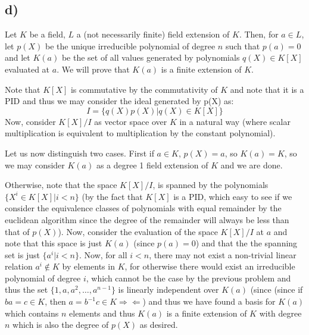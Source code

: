 \subsection*{d)}
Let $K$ be a field, $L$ a (not necessarily finite) field extension of $K$. Then, for $a\in L$, let $p(X)$ be the unique irreducible polynomial of degree $n$ such that $p(a)=0$ and let $K(a)$ be the set of all values generated by polynomials $q(X)\in K[X]$ evaluated at $a$. We will prove that $K(a)$ is a finite extension of $K$. \par 
Note that $K[X]$ is commutative by the commutativity of $K$ and note that it is a PID and thus we may consider the ideal generated by p(X) as:
\[ I=\{ q(X)p(X) | q(X)\in K[X] \} \]
Now, consider $K[X]/I$ as vector space over $K$ in a natural way (where scalar multiplication is equivalent to multiplication by the constant polynomial). \par 
Let us now distinguish two cases. First if $a\in K$, $p(X)=a$, so $K(a)=K$, so we may consider $K(a)$ as a degree 1 field extension of $K$ and we are done. \par
Otherwise, note that the space $K[X]/I$, is spanned by the polynomials $\{X^i \in K[X] | i<n\}$ (by the fact that $K[X]$ is a PID, which easy to see if we consider the equivalence classes of polynomials with equal remainder by the euclidean algorithm since the degree of the remainder will always be less than that of $p(X)$). Now, consider the evaluation of the space $K[X]/I$ at $a$ and note that this space is just $K(a)$ (since $p(a)=0$) and that the the spanning set is just $\{a^i | i<n\}$.  Now, for all $i<n$, there may not exist a non-trivial linear relation $a^i\notin K$ by elements in $K$, for otherwise there would exist an irreducible polynomial of degree $i$, which cannot be the case by the previous problem and thus the set $\{ 1, a, a^2, \ldots, a^{n-1} \}$ is linearly independent over $K(a)$ (since  (since if $ba=c\in K$, then $a=b^{-1}c\in K \Rightarrow\Leftarrow$) and thus we have found a basis for $K(a)$ which contains $n$ elements and thus $K(a)$ is a finite extension of $K$ with degree $n$ which is also the degree of $p(X)$ as desired. 
